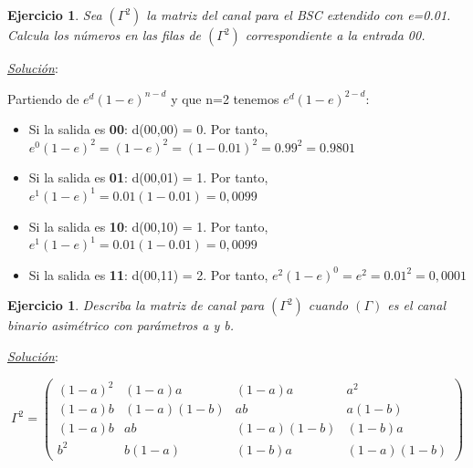 \documentclass{beamer}
\theoremstyle{plain}
\theoremstyle{example}
\newtheorem{ejercicio} [Ejercicio]{Ejercicio}
\theoremstyle{example}
\begin{document}
\begin{frame}  \small 
\begin{ejercicio} 
Sea $(\Gamma^2)$ la matriz del canal para el BSC extendido con e=0.01. Calcula los números en las filas de $(\Gamma^2)$ correspondiente a la entrada 00.
\end{ejercicio}

\textit{\underline{Solución}}:\\
\vspace{0.3cm}

Partiendo de $e^d (1-e)^{n-d} $ y que n=2 tenemos $e^d (1-e)^{2-d}$:\\

\begin{itemize}
    \item Si la salida es \textbf{00}: d(00,00) = 0. 
    Por tanto, $e^0 (1-e)^{2}= (1-e)^{2}=(1-0.01)^{2}=0.99^{2}=0.9801$

    \item Si la salida es \textbf{01}: d(00,01) = 1.
    Por tanto, $e^1 (1-e)^{1}= 0.01 (1-0.01)= 0,0099 $

    \item Si la salida es \textbf{10}: d(00,10) = 1.
    Por tanto, $e^1 (1-e)^{1}= 0.01 (1-0.01)= 0,0099 $

    \item Si la salida es \textbf{11}: d(00,11) = 2.
     Por tanto, $e^2 (1-e)^{0}= e^{2}=0.01^{2}=0,0001$
    
\end{itemize}


\end{frame} 


\begin{frame}  \small 
\begin{ejercicio} 
Describa la matriz de canal para $(\Gamma^2)$  cuando $(\Gamma)$ es el canal binario asimétrico con parámetros a y b.

\end{ejercicio}

\textit{\underline{Solución}}:\\
\vspace{0.3cm}

\[
\Gamma^2 = \left( \begin{array}{ccccc}
                   
                (1-a)^2  & (1-a) a          & (1-a) a  & a^2 \\
                 (1-a) b  & (1-a)(1-b)    & ab       &  a(1-b) \\
                 (1-a) b  &  a b  & (1-a) (1-b) & (1-b) a \\
                 b^2       & b (1-a)  & (1-b) a  & (1-a) (1-b)  
           \end{array}
    \right) 
\]
\end{frame} 
\end{document}
